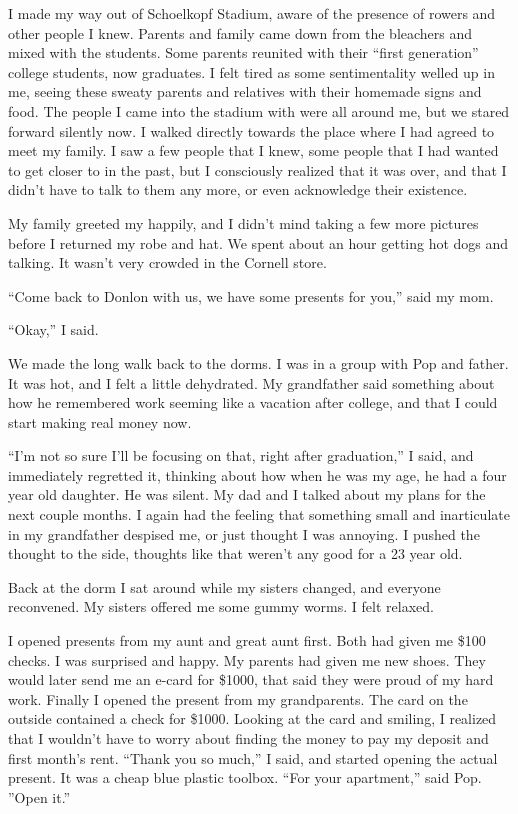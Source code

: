 \documentclass[12pt]{memoir}
\begin{document}
I made my way out of Schoelkopf Stadium, aware of the presence of rowers and
other people I knew.  Parents and family came down from the bleachers and mixed
with the students.  Some parents reunited with their ``first generation''
college students, now graduates.  I felt tired as some sentimentality welled up
in me, seeing these sweaty parents and relatives with their homemade signs and
food.  The people I came into the stadium with were all around me, but we stared
forward silently now.  I walked directly towards the place where I had agreed to
meet my family.  I saw a few people that I knew, some people that I had wanted
to get closer to in the past, but I consciously realized that it was over, and
that I didn't have to talk to them any more, or even acknowledge their existence.

My family greeted my happily, and I didn't mind taking a few more pictures
before I returned my robe and hat.  We spent about an hour getting hot dogs and
talking.  It wasn't very crowded in the Cornell store. 

``Come back to Donlon with us, we have some presents for you,'' said my mom. 

``Okay,'' I said.  

We made the long walk back to the dorms.  I was in a group with Pop and father.
It was hot, and I felt a little dehydrated.  My grandfather said something about
how he remembered work seeming like a vacation after college, and that I could
start making real money now.

``I'm not so sure I'll be focusing on that, right after graduation,'' I said,
and immediately regretted it, thinking about how when he was my age, he had a
four year old daughter.  He was silent.  My dad and I talked about my plans for
the next couple months.  I again had the feeling that something small and
inarticulate in my grandfather despised me, or just thought I was annoying.  I
pushed the thought to the side, thoughts like that weren't any good for a 23
year old.

Back at the dorm I sat around while my sisters changed, and everyone reconvened.
My sisters offered me some gummy worms.  I felt relaxed.

I opened presents from my aunt and great aunt first.  Both had given me \$100
checks.  I was surprised and happy.  My parents had given me new shoes.  They
would later send me an e-card for \$1000, that said they were proud of my hard
work.  Finally I opened the present from my grandparents.  The card on the
outside contained a check for \$1000.  Looking at the card and smiling, I
realized that I wouldn't have to worry about finding the money to pay my deposit
and first month's rent.  ``Thank you so much,'' I said, and started opening the
actual present.  It was a cheap blue plastic toolbox.  ``For your apartment,''
said Pop.  ''Open it.''
\end{document}
